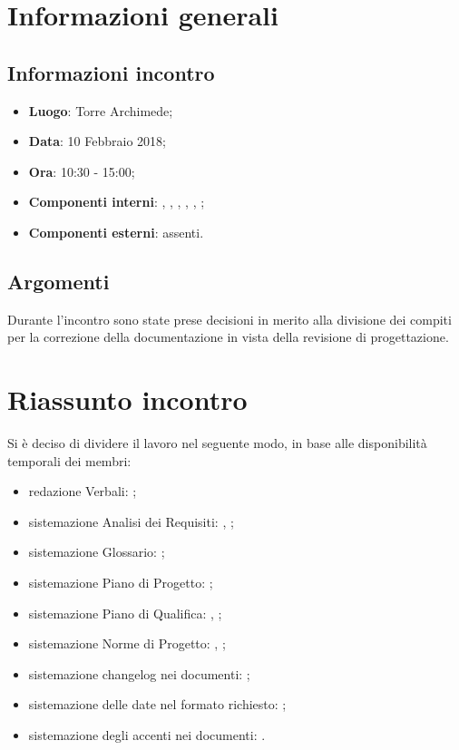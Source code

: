 \section{Informazioni generali}
\subsection{Informazioni incontro}
\begin{itemize}
\item \textbf{Luogo}: Torre Archimede;
\item \textbf{Data}: 10 Febbraio 2018;
\item \textbf{Ora}: 10:30 - 15:00;
\item \textbf{Componenti interni}: \Tommaso, \Carlo, \Mattia, \Luca, \Cristian, \Leonardo;
\item \textbf{Componenti esterni}: assenti.
\end{itemize}

\subsection{Argomenti}
Durante l'incontro sono state prese decisioni in merito alla divisione dei compiti per la correzione della documentazione in vista della revisione di progettazione.

\section{Riassunto incontro}
Si è deciso di dividere il lavoro nel seguente modo, in base alle disponibilità temporali dei membri:
\begin{itemize}
    \item redazione Verbali: \Tommaso;
    \item sistemazione Analisi dei Requisiti: \Tommaso{}, \Mattia{};
    \item sistemazione Glossario: \Isacco{};
    \item sistemazione Piano di Progetto: \Tommaso{};
    \item sistemazione Piano di Qualifica: \Cristian{}, \Luca{};
    \item sistemazione Norme di Progetto: \Mattia{}, \Carlo{};
    \item sistemazione changelog nei documenti: \Mattia{};
    \item sistemazione delle date nel formato richiesto: \Tommaso{};
    \item sistemazione degli accenti nei documenti: \Cristian{}.
\end{itemize}

